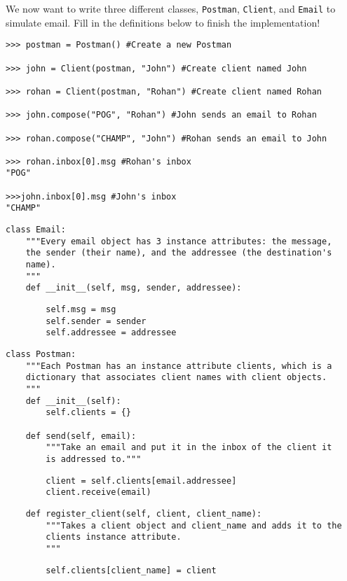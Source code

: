 \question

We now want to write three different classes, \texttt{Postman}, \texttt{Client},
and \texttt{Email} to simulate email. Fill in the definitions below to finish
the implementation!
\begin{lstlisting}
>>> postman = Postman() #Create a new Postman

>>> john = Client(postman, "John") #Create client named John

>>> rohan = Client(postman, "Rohan") #Create client named Rohan

>>> john.compose("POG", "Rohan") #John sends an email to Rohan

>>> rohan.compose("CHAMP", "John") #Rohan sends an email to John

>>> rohan.inbox[0].msg #Rohan's inbox
"POG"

>>>john.inbox[0].msg #John's inbox
"CHAMP"
\end{lstlisting}
\pagebreak
\begin{lstlisting}
class Email:
    """Every email object has 3 instance attributes: the message,
    the sender (their name), and the addressee (the destination's
    name).
    """
    def __init__(self, msg, sender, addressee):
\end{lstlisting}
\begin{solution}[1in]
\begin{lstlisting}
        self.msg = msg
        self.sender = sender
        self.addressee = addressee
\end{lstlisting}
\end{solution}


\begin{lstlisting}
class Postman:
    """Each Postman has an instance attribute clients, which is a
    dictionary that associates client names with client objects.
    """
    def __init__(self):
        self.clients = {}

    def send(self, email):
        """Take an email and put it in the inbox of the client it
        is addressed to."""
\end{lstlisting}
\begin{solution}[1in]
\begin{lstlisting}
        client = self.clients[email.addressee]
        client.receive(email)
\end{lstlisting}
\end{solution}

\begin{lstlisting}
    def register_client(self, client, client_name):
        """Takes a client object and client_name and adds it to the
        clients instance attribute.
        """
\end{lstlisting}
\begin{solution}[1in]
\begin{lstlisting}
        self.clients[client_name] = client
\end{lstlisting}
\end{solution}

